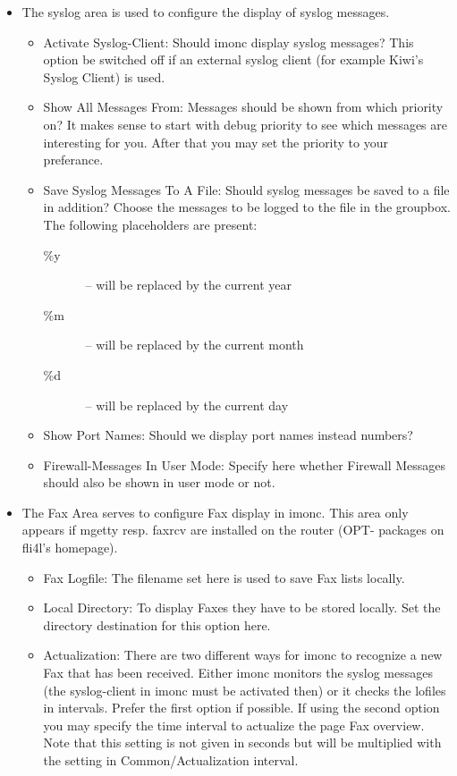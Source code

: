 \begin{itemize}
  \item The syslog area is used to configure the display of syslog messages.
    \begin{itemize}
      \item Activate Syslog-Client: Should imonc display syslog messages? This
      option be switched off if an external syslog client (for example Kiwi's
      Syslog Client) is used.
      \item Show All Messages From: Messages should be shown from which priority
      on? It makes sense to start with debug priority to see which messages
      are interesting for you. After that you may set the priority to your
      preferance.
      \item Save Syslog Messages To A File: Should syslog messages be saved to
      a file in addition? Choose the messages to be logged to the file in the
      groupbox. The following placeholders are present:
        \begin{description}
          \item[\%y]~-- will be replaced by the current year
          \item[\%m]~-- will be replaced by the current month
          \item[\%d]~-- will be replaced by the current day
        \end{description}
      \item Show Port Names: Should we display port names instead numbers?
      \item Firewall-Messages In User Mode: Specify here whether Firewall Messages
	should also be shown in user mode or not.
    \end{itemize}

  \item The Fax Area serves to configure Fax display in imonc.
    This area only appears if mgetty resp. faxrcv are installed on the router (OPT-
    packages on fli4l's homepage).
    \begin{itemize}
      \item Fax Logfile: The filename set here is used to save Fax lists locally.
      \item Local Directory: To display Faxes they have to be stored locally. Set the
	directory destination for this option here.
      \item Actualization: There are two different ways for imonc to recognize a new
	Fax that has been received. Either imonc monitors the syslog messages
        (the syslog-client in imonc must be activated then) or it checks the lofiles
        in intervals. Prefer the first option if possible. If using the second option
        you may specify the time interval to actualize the page Fax overview. Note
        that this setting is not given in seconds but will be multiplied with the
        setting in Common/Actualization interval.
    \end{itemize}


\end{itemize}
